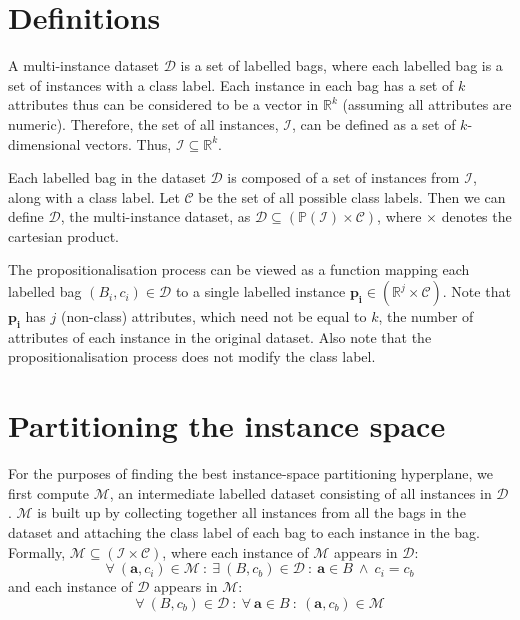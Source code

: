 \documentclass[a4paper,12pt]{report} %
\newcommand{\real}{\mathbb{R}}
\newcommand{\mcl}[1]{\mathcal{#1}}
\newcommand{\power}{\mathbb{P}}
\newcommand{\vect}[1]{\boldsymbol{#1}}
\begin{document}
\section{Definitions}
A multi-instance dataset $\mcl{D}$ is a set of labelled bags, 
    where each labelled bag is a set of instances with a class label.
Each instance in each bag has a set of $k$ attributes
    thus can be considered to be a vector in $\real^k$
    (assuming all attributes are numeric).
Therefore, the set of all instances, $\mcl{I}$,
    can be defined as a set of $k$-dimensional vectors.
Thus, $ \mcl{I} \subseteq \real^k $.

Each labelled bag in the dataset $\mcl{D}$ is 
    composed of a set of instances from $\mcl{I}$,
    along with a class label. %
Let $\mcl{C}$ be the set of all possible class labels.
Then we can define $\mcl{D}$,
    the multi-instance dataset, as 
    $\mcl{D} \subseteq ( \power (\mcl{I}) \times \mcl{C} )$,
    where $\times$ denotes the cartesian product.

The propositionalisation process can be viewed as a function
    mapping each labelled bag $({B_i},c_i) \in \mcl{D}$ to 
    a single labelled instance $\vect{p_i} \in ( \real^j \times \mcl{C} )$.
Note that $\vect{p_i}$ has $j$ (non-class) attributes, 
    which need not be equal to $k$, the number of attributes of 
    each instance in the original dataset.
Also note that the propositionalisation process 
    does not modify the class label.
       

\section{Partitioning the instance space}

For the purposes of finding the best instance-space partitioning hyperplane,
    we first compute $\mcl{M}$, an intermediate labelled dataset 
    consisting of all instances in $\mcl{D}$.
$\mcl{M}$ is built up by collecting together all instances
    from all the bags in the dataset and 
    attaching the class label of each bag to 
    each instance in the bag.
Formally, $\mcl{M} \subseteq (\mcl{I} \times \mcl{C})$, 
    where each instance of $\mcl{M}$ appears in $\mcl{D}$:
    $$
        \forall~(\vect{a},c_i)\in\mcl{M} ~:~ 
            \exists~({B},c_b) \in \mcl{D} ~:~ 
                \vect{a} \in {B} ~\land~ c_i = c_b
    $$
    and each instance of $\mcl{D}$ appears in $\mcl{M}$:
    $$
        \forall~({B},c_b) \in \mcl{D} ~:~ 
            \forall~\vect{a} \in {B} ~:~
                (\vect{a},c_b) \in \mcl{M}
    $$    
\end{document}
